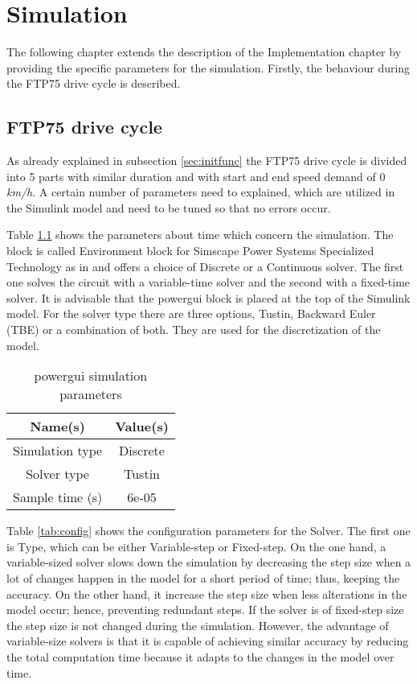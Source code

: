 \chapter{Simulation}
\label{chp:simulation}
The following chapter extends the description of the Implementation chapter by providing the specific parameters for the simulation. Firstly, the behaviour during the FTP75 drive cycle is described.


\section{FTP75 drive cycle}
As already explained in subsection \ref{sec:initfunc} the FTP75 drive cycle is divided into 5 parts with similar duration and with start and end speed demand of 0 \textit{km/h}. A certain number of parameters need to explained, which are utilized in the Simulink model and need to be tuned so that no errors occur. 

Table \ref{tab:powergui} shows the parameters about time which concern the simulation. The block is called  Environment block for Simscape Power Systems Specialized Technology as in \citep{powerguiMatlab} and offers a choice of Discrete or a Continuous solver. The first one solves the circuit with a variable-time solver and the second with a fixed-time solver. It is advisable that the powergui block is placed at the top of the Simulink model. For the solver type there are three options, Tustin, Backward Euler (TBE) or a combination of both. They are used for the discretization of the model.

\begin{table}
\centering
\begin{tabular}{ |c|c| } 
 \hline
 Name(s) & Value(s) \\
 \hline\hline
 Simulation type & Discrete  \\ 
 Solver type & Tustin \\ 
 Sample time (s) & 6e-05 \\ 
 \hline
\end{tabular}
\caption{powergui simulation parameters }
\label{tab:powergui}
\end{table}

Table \ref{tab:config} shows the configuration parameters for the Solver. The first one is Type, which can be either Variable-step or Fixed-step. On the one hand, a variable-sized solver slows down the simulation by decreasing the step size when a lot of changes happen in the model for a short period of time; thus, keeping the accuracy. On the other hand, it increase the step size when less alterations in the model occur; hence, preventing redundant steps. If the solver is of fixed-step size the step size is not changed during the simulation. However, the advantage of variable-size solvers is that it is capable of achieving similar accuracy  by reducing the total computation time because it adapts to the changes in the model over time.

